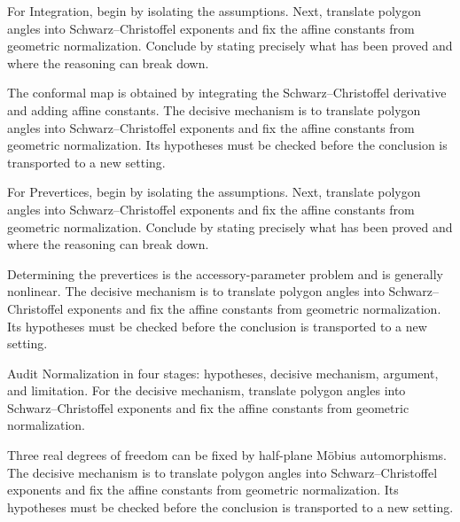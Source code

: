 \begin{problem}\label{prob:iv18-problem-04}
For Integration, begin by isolating the assumptions. Next, translate polygon angles into Schwarz--Christoffel exponents and fix the affine constants from geometric normalization. Conclude by stating precisely what has been proved and where the reasoning can break down.
\end{problem}
\begin{solution}
The conformal map is obtained by integrating the Schwarz–Christoffel derivative and adding affine constants. The decisive mechanism is to translate polygon angles into Schwarz--Christoffel exponents and fix the affine constants from geometric normalization. Its hypotheses must be checked before the conclusion is transported to a new setting.
\end{solution}

\begin{problem}\label{prob:iv18-problem-05}
For Prevertices, begin by isolating the assumptions. Next, translate polygon angles into Schwarz--Christoffel exponents and fix the affine constants from geometric normalization. Conclude by stating precisely what has been proved and where the reasoning can break down.
\end{problem}
\begin{solution}
Determining the prevertices is the accessory-parameter problem and is generally nonlinear. The decisive mechanism is to translate polygon angles into Schwarz--Christoffel exponents and fix the affine constants from geometric normalization. Its hypotheses must be checked before the conclusion is transported to a new setting.
\end{solution}

\begin{problem}\label{prob:iv18-problem-06}
Audit Normalization in four stages: hypotheses, decisive mechanism, argument, and limitation. For the decisive mechanism, translate polygon angles into Schwarz--Christoffel exponents and fix the affine constants from geometric normalization.
\end{problem}
\begin{solution}
Three real degrees of freedom can be fixed by half-plane Möbius automorphisms. The decisive mechanism is to translate polygon angles into Schwarz--Christoffel exponents and fix the affine constants from geometric normalization. Its hypotheses must be checked before the conclusion is transported to a new setting.
\end{solution}


